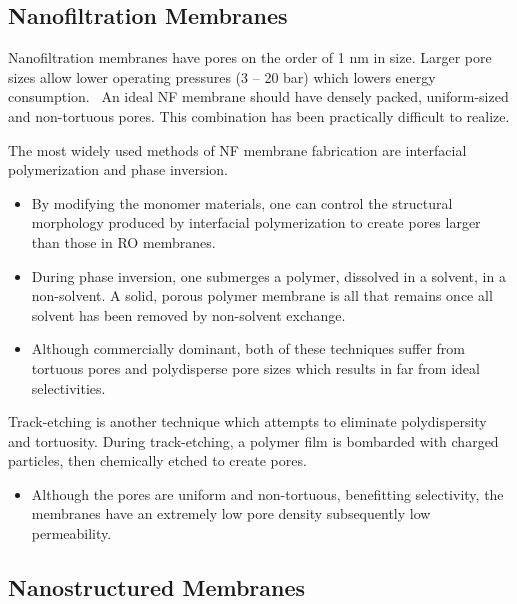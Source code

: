   \subsection{Nanofiltration Membranes}

  Nanofiltration membranes have pores on the order of 1 nm in size. Larger pore sizes 
  allow lower operating pressures (3 -- 20 bar) which lowers energy consumption.~\cite{van_der_bruggen_review_2003}
  An ideal NF membrane should have densely packed, uniform-sized and non-tortuous pores.
  This combination has been practically difficult to realize.

  The most widely used methods of NF membrane fabrication are interfacial polymerization
  and phase inversion.
  \begin{itemize}
    \item By modifying the monomer materials, one can control the structural morphology
    produced by interfacial polymerization to create pores larger than those in RO
    membranes.~\cite{seman_nanofiltration_2010}
    \item During phase inversion, one submerges a polymer, dissolved in a solvent, in
    a non-solvent. A solid, porous polymer membrane is all that remains once all
    solvent has been removed by non-solvent exchange.~\cite{smolders_microstructures_1992}
    \item Although commercially dominant, both of these techniques suffer from
    tortuous pores and polydisperse pore sizes which results in far from ideal 
    selectivities.
  \end{itemize}  
    
  Track-etching is another technique which attempts to eliminate polydispersity and tortuosity.
  During track-etching, a polymer film is bombarded with charged particles, then chemically 
  etched to create pores.~\cite{apel_track_2001}
  \begin{itemize}
	\item Although the pores are uniform and non-tortuous, benefitting selectivity, the 
	membranes have an extremely low pore density subsequently low permeability. 
  \end{itemize}
  
  
  \subsection{Nanostructured Membranes}
  
